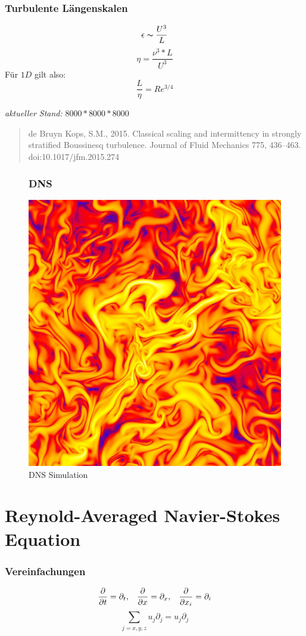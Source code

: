 \documentclass[11pt,t]{beamer}
\begin{document}
\begin{frame}
	\frametitle{Turbulente Längenskalen}
\begin{equation}
\epsilon\thicksim \frac{U^3}{L}
\end{equation}
\begin{equation}
\eta = \frac{\nu^3 * L}{U^3}
\end{equation}
Für $1D$ gilt also:
\begin{equation}
\frac{L}{\eta} = Re^{3/4} 
\end{equation}

\vspace{0.5cm}
\textit{aktueller Stand:} $8000*8000*8000$

\begin{quote}
de Bruyn Kops, S.M., 2015. Classical scaling and intermittency in
strongly stratified Boussinesq turbulence. Journal of Fluid Mechanics
775, 436–463. doi:10.1017/jfm.2015.274
\end{quote}
\end{frame}
\begin{frame}
\begin{figure}
\frametitle{DNS}
\includegraphics[width=0.5\linewidth]{images/DNS_HOMOG_Shear_zoom.png}
			\caption{DNS Simulation}
\end{figure}
\end{frame}

\section{Reynold-Averaged Navier-Stokes Equation}


\begin{frame}
	\frametitle{Vereinfachungen}
\begin{equation}
\frac{\partial}{\partial t} = \partial_t, \hspace{0.3 cm}\frac{\partial}{\partial x} = \partial_x,\hspace{0.3 cm} \frac{\partial}{\partial x_i} = \partial_i
\end{equation}
\begin{equation}
\sum_{j=x,y,z}u_j\partial_j = u_j\partial_j
\end{equation}
\end{frame}
\end{document}
